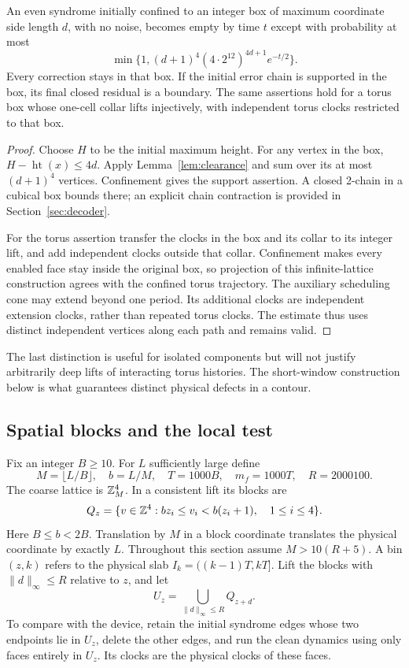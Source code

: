 \begin{corollary}\label{cor:island}
An even syndrome initially confined to an integer box of maximum
coordinate side length \(d\), with no noise, becomes empty by time
\(t\) except with probability at most
\[
 \min\{1,(d+1)^4(4\cdot2^{12})^{4d+1}e^{-t/2}\}.
\]
Every correction stays in that box. If the initial error chain is
supported in the box, its final closed residual is a boundary.
The same assertions hold for a torus box whose one-cell collar lifts
injectively, with independent torus clocks restricted to that box.
\end{corollary}
\begin{proof}
Choose \(H\) to be the initial maximum height. For any vertex in the
box, \(H-\operatorname{ht}(x)\le4d\). Apply
Lemma~\ref{lem:clearance} and sum over its at most \((d+1)^4\)
vertices. Confinement gives the support assertion. A closed 2-chain
in a cubical box bounds there; an explicit chain contraction is
provided in Section~\ref{sec:decoder}.

For the torus assertion transfer the clocks in the box and its collar
to its integer lift, and add independent clocks outside that collar.
Confinement makes every enabled face stay inside the original box,
so projection of this infinite-lattice construction agrees with the
confined torus trajectory. The auxiliary scheduling cone may extend
beyond one period. Its additional clocks are independent extension
clocks, rather than repeated torus clocks. The estimate thus uses
distinct independent vertices along each path and remains valid.
\end{proof}

The last distinction is useful for isolated components but will not
justify arbitrarily deep lifts of interacting torus histories. The
short-window construction below is what guarantees distinct physical
defects in a contour.

\subsection{Spatial blocks and the local test}

Fix an integer \(B\ge10\). For \(L\) sufficiently large define
\begin{equation}\label{eq:block-parameters}
 M=\lfloor L/B\rfloor,\quad b=L/M,\quad
 T=1000B,\quad m_f=1000T,\quad R=2000100.
\end{equation}
The coarse lattice is \(\mathbb Z_M^4\). In a consistent lift its blocks are
\[
 Q_z=\{v\in\mathbb Z^4:bz_i\le v_i<b(z_i+1),\quad1\le i\le4\}.
\]
Here \(B\le b<2B\). Translation by \(M\) in a block coordinate translates
the physical coordinate by exactly \(L\). Throughout this section
assume \(M>10(R+5)\). A bin \((z,k)\) refers to the physical slab
\(I_k=((k-1)T,kT]\). Lift the blocks with
\(\|d\|_\infty\le R\) relative to \(z\), and let
\[
 U_z=\bigcup_{\|d\|_\infty\le R}Q_{z+d}.
\]
To compare with the device, retain the initial syndrome edges whose
two endpoints lie in \(U_z\), delete the other edges, and run the
clean dynamics using only faces entirely in \(U_z\). Its clocks are
the physical clocks of these faces.


